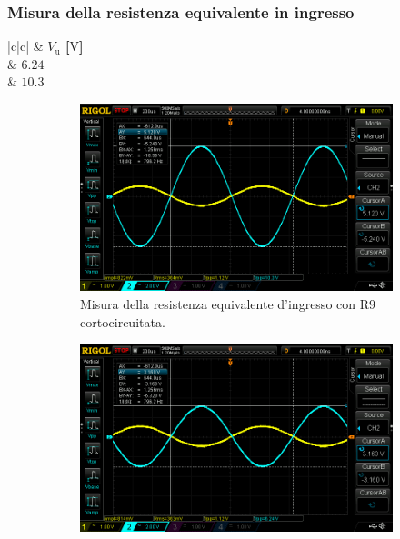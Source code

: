 \documentclass[a4paper]{article}
\begin{document}
			\subsubsection{Misura della resistenza equivalente in ingresso}
				\begin{center}
					\begin{tabular}{ |c|c| }
						\hline
						\multirow{} 						 & \textbf{$ V_{\mathrm{u}} $ [$ \mathrm{V} $]} \\
						\hline
								 & $ 6.24 $ \\
						 & $ 10.3 $ \\
						\hline
					\end{tabular}
				\end{center}
				\begin{figure}[h!]
					\centering
					\begin{subfigure}{0.4\textwidth}
						\centering
						\includegraphics[scale=0.2]{misuraDellaResistenzaEquivalenteInIngressoAmplificatoreInvertenteR9InCorto}
						\caption{Misura della resistenza equivalente d'ingresso con R9 cortocircuitata.}
					\end{subfigure}
					\begin{subfigure}{0.4\textwidth}
						\centering
						\includegraphics[scale=0.2]{misuraDellaResistenzaEquivalenteInIngressoAmplificatoreInvertenteR9Inserita}

\end{subfigure}
\end{figure}
\end{document}
